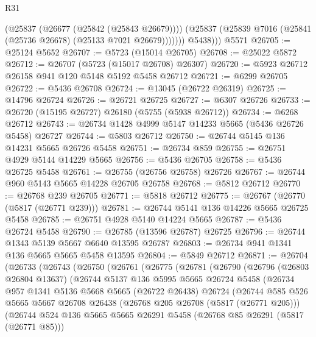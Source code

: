 \begin{lexlean}{R31}
\begin{coremodule}
              (@25837 (@26677 (@25842 (@25843 @26679))))
              (@25837 (@25839 @7016 (@25841 (@25736 @26678) (@25133 @7021 @26679)))))))
          @5438)))
    @5571
@26705 := @25124 @5652
@26707 := @5723 (@15014 @26705)
@26708 := @25022 @5872
@26712 := @26707 (@5723 (@15017 @26708) @26307)
@26720 := @5923 @26712 @26158 @941 @120 @5148 @5192 @5458 @26712
@26721 := @6299 @26705
@26722 := @5436 @26708
@26724 := @13045 (@26722 @26319)
@26725 := @14796 @26724
@26726 := @26721 @26725
@26727 := @6307 @26726
@26733 := @26720 (@15195 @26727) @26180 (@5755 (@5938 @26712))
@26734 := @6268 @26712
@26743 := @26734 @1428 @4999 @5147 @14233 @5665 (@5436 @26726 @5458) @26727
@26744 := @5803 @26712
@26750 := @26744 @5145 @136 @14231 @5665 @26726 @5458
@26751 := @26734 @859
@26755 := @26751 @4929 @5144 @14229 @5665
@26756 := @5436 @26705
@26758 := @5436 @26725 @5458
@26761 := @26755 (@26756 @26758) @26726
@26767 := @26744 @960 @5143 @5665 @14228 @26705 @26758
@26768 := @5812 @26712
@26770 := @26768 @239 @26705
@26771 := @5818 @26712
@26775 := @26767 (@26770 (@5817 (@26771 @239)))
@26781 := @26744 @5141 @136 @14226 @5665 @26725 @5458
@26785 := @26751 @4928 @5140 @14224 @5665
@26787 := @5436 @26724 @5458
@26790 := @26785 (@13596 @26787) @26725
@26796 := @26744 @1343 @5139 @5667 @6640 @13595 @26787
@26803 := @26734 @941 @1341 @136 @5665 @5665 @5458 @13595
@26804 := @5849 @26712
@26871 := @26704
    (@26733
      (@26743
        (@26750
          (@26761
            (@26775
              (@26781
                (@26790
                  (@26796
                    (@26803 @26804 @13637)
                    (@26744
                      @5137
                      @136
                      @5995
                      @5665
                      @26724
                      @5458
                      (@26734
                        @957
                        @1341
                        @5136
                        @5668
                        @5665
                        (@26722 @26438)
                        @26724
                        (@26744
                          @585
                          @526
                          @5665
                          @5667
                          @26708
                          @26438
                          (@26768 @205 @26708 (@5817 (@26771 @205)))
                          (@26744
                            @524
                            @136
                            @5665
                            @5665
                            @26291
                            @5458
                            (@26768 @85 @26291 (@5817 (@26771 @85)))

\end{coremodule}
\end{lexlean}
